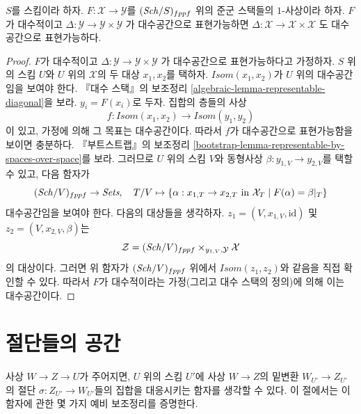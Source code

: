 \begin{lemma}
\label{lemma-diagonals-and-algebraic-morphisms}
$S$를 스킴이라 하자. $F : \mathcal{X} \to \mathcal{Y}$를
$(\mathit{Sch}/S)_{fppf}$ 위의 준군 스택들의 $1$-사상이라 하자.
$F$가 대수적이고
$\Delta : \mathcal{Y} \to \mathcal{Y} \times \mathcal{Y}$
가 대수공간으로 표현가능하면
$\Delta : \mathcal{X} \to \mathcal{X} \times \mathcal{X}$
도 대수공간으로 표현가능하다.
\end{lemma}

\begin{proof}
$F$가 대수적이고
$\Delta : \mathcal{Y} \to \mathcal{Y} \times \mathcal{Y}$
가 대수공간으로 표현가능하다고 가정하자.
$S$ 위의 스킴 $U$와 $U$ 위의 $\mathcal{X}$의 두 대상
$x_1, x_2$를 택하자. $\mathit{Isom}(x_1, x_2)$가 $U$ 위의
대수공간임을 보여야 한다. 『대수 스택』의 보조정리
\ref{algebraic-lemma-representable-diagonal}을 보라.
$y_i = F(x_i)$로 두자. 집합의 층들의 사상
$$
f : \mathit{Isom}(x_1, x_2) \to \mathit{Isom}(y_1, y_2)
$$
이 있고, 가정에 의해 그 목표는 대수공간이다. 따라서 $f$가
대수공간으로 표현가능함을 보이면 충분하다. 『부트스트랩』의 보조정리
\ref{bootstrap-lemma-representable-by-spaces-over-space}를 보라.
그러므로 $U$ 위의 스킴 $V$와 동형사상
$\beta : y_{1, V} \to y_{2, V}$를 택할 수 있고, 다음 함자가
$$
(\mathit{Sch}/V)_{fppf} \to \textit{Sets},\quad
T/V \mapsto \{\alpha : x_{1, T} \to x_{2, T}
\text{ in }\mathcal{X}_T \mid F(\alpha) = \beta|_T\}
$$
대수공간임을 보여야 한다. 다음의 대상들을 생각하자.
$z_1 = (V, x_{1, V}, \text{id})$ 및
$z_2 = (V, x_{2, V}, \beta)$는
$$
\mathcal{Z} = (\mathit{Sch}/V)_{fppf} \times_{y_{1, V}, \mathcal{Y}} \mathcal{X}
$$
의 대상이다. 그러면 위 함자가 $(\mathit{Sch}/V)_{fppf}$ 위에서
$\mathit{Isom}(z_1, z_2)$와 같음을 직접 확인할 수 있다.
따라서 $F$가 대수적이라는 가정(그리고 대수 스택의 정의)에 의해
이는 대수공간이다.
\end{proof}
















\section{절단들의 공간}
\label{section-spaces-sections}

\noindent
사상 $W \to Z \to U$가 주어지면, $U$ 위의 스킴 $U'$에
사상 $W \to Z$의 밑변환 $W_{U'} \to Z_{U'}$의 절단
$\sigma : Z_{U'} \to W_{U'}$들의 집합을 대응시키는 함자를 생각할 수 있다.
이 절에서는 이 함자에 관한 몇 가지 예비 보조정리를 증명한다.

